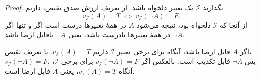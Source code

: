     \begin{proof}
      بگذارید $\mathscr{I}$ یک تعبیر دلخواه باشد. از تعریف ارزش صدق نقیض، داریم
      \[
        v_{\mathscr{I}}(A) =T
        \;\Longleftrightarrow\;
        v_{\mathscr{I}}(\neg A) = F.
      \]
      از آنجا که $\mathscr{I}$ دلخواه بود، نتیجه می‌شود $A$ در همهٔ تعبیرها درست است اگر و تنها اگر $\neg A$ در همهٔ تعبیرها نادرست باشد، یعنی $\neg A$ ناقابل ارضا باشد.
      
      اگر $A$ قابل ارضا باشد، آنگاه برای برخی تعبیر $\mathscr{I}$ داریم $v_{\mathscr{I}}(A)=T$. با تعریف نقیض،\\ $v_{\mathscr{I}}(\neg A)=F$، پس $\neg A$ قابل تکذیب است. بالعکس اگر $v_{\mathscr{I}}(\neg A)=F$ برای برخی $\mathscr{I}$، آنگاه $v_{\mathscr{I}}(A)=T$، یعنی $A$ قابل ارضا است.
    \end{proof}

